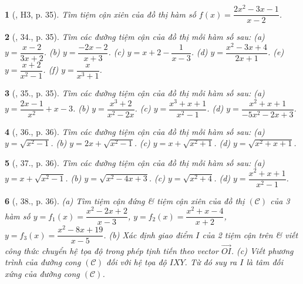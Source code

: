 \documentclass{article}
\newtheorem{baitoan}{}
\begin{document}
\begin{baitoan}[\cite{SGK_Toan_12_giai_tich_nang_cao}, H3, p. 35]
	Tìm tiệm cận xiên của đồ thị hàm số $f(x) = \dfrac{2x^2 - 3x - 1}{x - 2}$.
\end{baitoan}

\begin{baitoan}[\cite{SGK_Toan_12_giai_tich_nang_cao}, 34., p. 35]
	Tìm các đường tiệm cận của đồ thị mỗi hàm số sau: (a) $y = \dfrac{x - 2}{3x + 2}$. (b) $y = \dfrac{-2x - 2}{x + 3}$. (c) $y = x + 2 - \dfrac{1}{x - 3}$. (d) $y = \dfrac{x^2 - 3x + 4}{2x + 1}$. (e) $y = \dfrac{x + 2}{x^2 - 1}$. (f) $y = \dfrac{x}{x^3 + 1}$.
\end{baitoan}

\begin{baitoan}[\cite{SGK_Toan_12_giai_tich_nang_cao}, 35., p. 35]
	Tìm các đường tiệm cận của đồ thị mỗi hàm số sau: (a) $y = \dfrac{2x - 1}{x^2} + x - 3$. (b) $y = \dfrac{x^3 + 2}{x^2 - 2x}$. (c) $y = \dfrac{x^3 + x + 1}{x^2 - 1}$. (d) $y = \dfrac{x^2 + x + 1}{-5x^2 - 2x + 3}$.
\end{baitoan}

\begin{baitoan}[\cite{SGK_Toan_12_giai_tich_nang_cao}, 36., p. 36]
	Tìm các đường tiệm cận của đồ thị mỗi hàm số sau: (a) $y = \sqrt{x^2 - 1}$. (b) $y = 2x + \sqrt{x^2 - 1}$. (c) $y = x + \sqrt{x^2 + 1}$. (d) $y = \sqrt{x^2 + x + 1}$.
\end{baitoan}

\begin{baitoan}[\cite{SGK_Toan_12_giai_tich_nang_cao}, 37., p. 36]
	Tìm các đường tiệm cận của đồ thị mỗi hàm số sau: (a) $y = x + \sqrt{x^2 - 1}$. (b) $y = \sqrt{x^2 - 4x + 3}$. (c) $y = \sqrt{x^2 + 4}$. (d) $y = \dfrac{x^2 + x + 1}{x^2 - 1}$.
\end{baitoan}

\begin{baitoan}[\cite{SGK_Toan_12_giai_tich_nang_cao}, 38., p. 36]
	(a) Tìm tiệm cận đứng \& tiệm cận xiên của đồ thị $(\mathcal{C})$ của 3 hàm số $y = f_1(x) = \dfrac{x^2 - 2x + 2}{x - 3}$, $y = f_2(x) = \dfrac{x^2 + x - 4}{x + 2}$, $y = f_3(x) = \dfrac{x^2 - 8x + 19}{x - 5}$. (b) Xác định giao điểm $I$ của 2 tiệm cận trên \& viết công thức chuyển hệ tọa độ trong phép tịnh tiến theo vector $\vec{OI}$. (c) Viết phương trình của đường cong $(\mathcal{C})$ đối với hệ tọa độ $IXY$. Từ đó suy ra $I$ là tâm đối xứng của đường cong $(\mathcal{C})$.
\end{baitoan}

\end{document}
